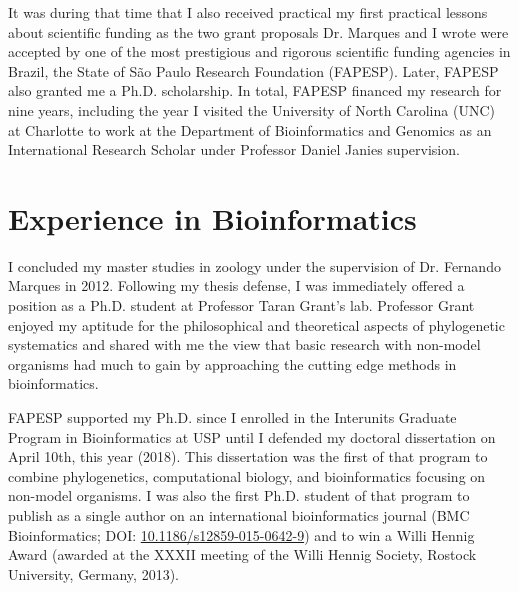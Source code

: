 \documentclass[12pt, a4paper, roman, twoside]{moderncv}        %
\begin{document}
{	It was during that time that I also received practical my first practical lessons about scientific funding as the two grant proposals Dr. Marques and I wrote were accepted by one of the most prestigious and rigorous scientific funding agencies in Brazil, the State of São Paulo Research Foundation (FAPESP). Later, FAPESP also granted me a Ph.D. scholarship. In total, FAPESP financed my research for nine years, including the year I visited the University of North Carolina (UNC) at Charlotte to work at the Department of Bioinformatics and Genomics as an International Research Scholar under Professor Daniel Janies supervision.
	}
%
\section{Experience in Bioinformatics}{\setlength{\parindent}{5ex}
    I concluded my master studies in zoology under the supervision of Dr. Fernando Marques in 2012. Following my thesis defense, I was immediately offered a position as a Ph.D. student at Professor Taran Grant's lab. Professor Grant enjoyed my aptitude for the philosophical and theoretical aspects of phylogenetic systematics and shared with me the view that basic research with non-model organisms had much to gain by approaching the cutting edge methods in bioinformatics.
    
	FAPESP supported my Ph.D. since I enrolled in the Interunits Graduate Program in Bioinformatics at USP until I defended my doctoral dissertation on April 10th, this year (2018).  This dissertation was the first of that program to combine phylogenetics, computational biology, and bioinformatics focusing on non-model organisms. I was also the first Ph.D. student of that program to publish as a single author on an international bioinformatics journal (BMC Bioinformatics; DOI: \href{https://bmcbioinformatics.biomedcentral.com/articles/10.1186/s12859-015-0642-9}{10.1186/s12859-015-0642-9}) and to win a Willi Hennig Award (awarded at the XXXII meeting of the Willi Hennig Society, Rostock University, Germany, 2013).
	
}
\end{document}
